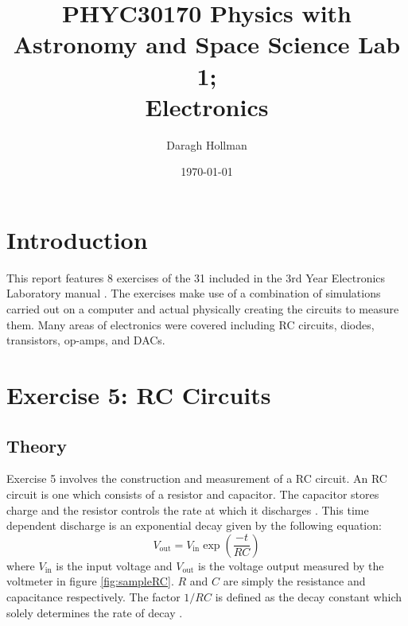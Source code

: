 \documentclass[%
reprint,
amsmath,amssymb,
aps,
floatfix
]{revtex4-2}
\begin{document}
	
	
	\title{PHYC30170 Physics with Astronomy and Space Science Lab 1;\\Electronics}
	
	\author{Daragh Hollman}
	
	\date{\today}
	
	\maketitle
	
	\section{Introduction}
		This report features 8 exercises of the 31 included in the 3rd Year Electronics Laboratory manual \cite{manual}. The exercises make use of a combination of simulations carried out on a computer and actual physically creating the circuits to measure them. Many areas of electronics were covered including RC circuits, diodes, transistors, op-amps, and DACs.
	
	\section{Exercise 5: RC Circuits}
		\subsection{Theory}
		Exercise 5 involves the construction and measurement of a RC circuit. An RC circuit is one which consists of a resistor and capacitor. The capacitor stores charge and the resistor controls the rate at which it discharges \cite{pumplin}. This time dependent discharge is an exponential decay given by the following equation:
		\begin{equation}
			V_\text{out} = V_\text{in} \exp{\left(\frac{-t}{RC}\right)}
			\label{eq:expDecay}
		\end{equation}where $V_\text{in}$ is the input voltage and $V_\text{out}$ is the voltage output measured by the voltmeter in figure \ref{fig:sampleRC}. $R$ and $C$ are simply the resistance and capacitance respectively. The factor $1/RC$ is defined as the decay constant which solely determines the rate of decay \cite{manual}.
		
\end{document}
